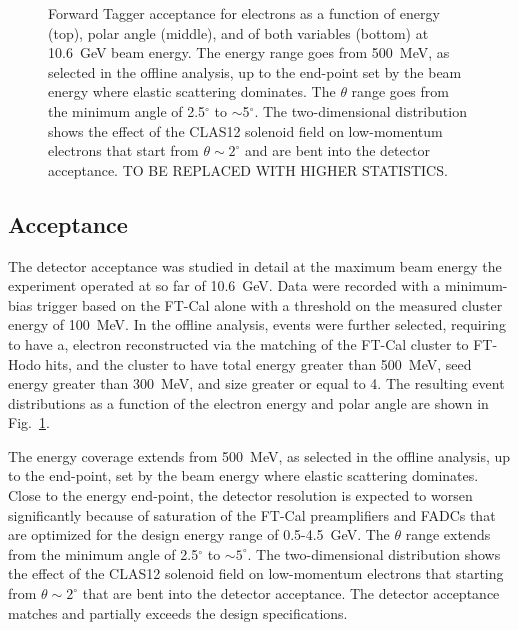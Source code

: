 \begin{figure}[ht]
\begin{center}
\end{center}
\caption{Forward Tagger acceptance for electrons as a function of energy (top), polar angle (middle), and of both
  variables (bottom) at 10.6~GeV beam energy. The energy range goes from 500~MeV, as selected in the offline
  analysis, up to the end-point set by the beam energy where elastic scattering dominates. The $\theta$ range goes
  from the minimum angle of 2.5$^\circ$ to $\sim$5$^\circ$. The two-dimensional distribution shows the effect of the
  CLAS12 solenoid field on low-momentum electrons that start from $\theta\sim2^\circ$ and are bent into the
  detector acceptance. TO BE REPLACED WITH HIGHER STATISTICS.}
\label{fig:ft_acceptance}
\end{figure}

\subsection{Acceptance}

The detector acceptance was studied in detail at the maximum beam energy the experiment operated at so far of
10.6~GeV. Data were recorded with a minimum-bias trigger based on the FT-Cal alone with a threshold on the
measured cluster energy of 100~MeV. In the offline analysis, events were further selected, requiring to have a,
electron reconstructed via the matching of the FT-Cal cluster to FT-Hodo hits, and the cluster to have total energy
greater than 500~MeV, seed energy greater than 300~MeV, and size greater or equal to 4. The resulting event
distributions as a function of the electron energy and polar angle are shown in Fig.~\ref{fig:ft_acceptance}. 

The energy coverage extends from 500~MeV, as selected in the offline analysis, up to the end-point, set by the
beam energy where elastic scattering dominates. Close to the energy end-point, the detector resolution is expected
to worsen significantly because of saturation of the FT-Cal preamplifiers and FADCs that are optimized for the
design energy range of 0.5-4.5~GeV. The $\theta$ range extends from the minimum angle of 2.5$^\circ$ to
$\sim5^\circ$. The two-dimensional distribution shows the effect of the CLAS12 solenoid field on low-momentum
electrons that starting from $\theta\sim2^\circ$ that are bent into the detector acceptance. The detector
acceptance matches and partially exceeds the design specifications. 

